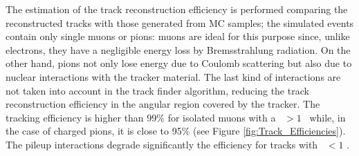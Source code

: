 \noindent The estimation of the track reconstruction efficiency is performed comparing the reconstructed tracks with 
those generated from MC samples; the simulated events contain only single muons or pions: muons are 
ideal for this purpose since, unlike electrons, they have a negligible energy loss by Bremsstrahlung 
radiation. On the other hand, pions not only lose energy due to Coulomb scattering 
but also due to nuclear interactions with the tracker material. The last kind of interactions
are not taken into account in the track finder algorithm, reducing the track reconstruction efficiency 
in the angular region covered by the tracker. The tracking efficiency is higher 
than 99$\%$ for isolated muons with a \pt~$>1$ \GeV~while, in the case of charged pions, it 
is close to 95$\%$ (see Figure \ref{fig:Track_Efficiencies}). The pileup interactions degrade 
significantly the efficiency for tracks with \pt~$<1$ \GeV \cite{TrackAndVertexReconstruction}. \\

